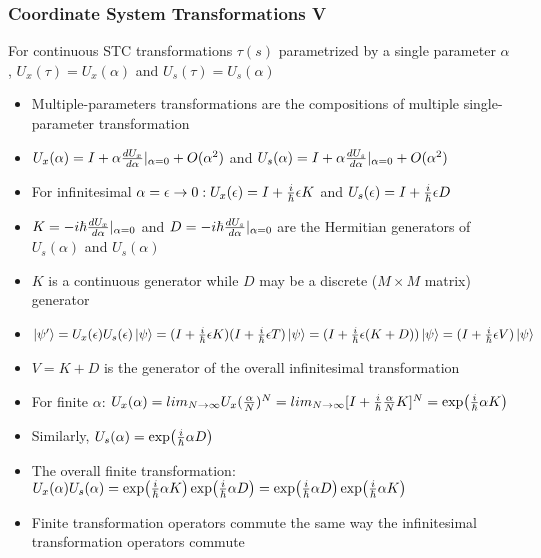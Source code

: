 \documentclass[8pt,t,mathserif,aspectratio=169]{beamer}
\begin{document}
\begin{frame}
  \frametitle{Coordinate System Transformations V}
  \vspace{1mm}
  For continuous STC transformations $\tau(s)$ parametrized by a single parameter $\alpha$, $U_x(\tau) = U_x(\alpha)$ and $U_s(\tau) = U_s(\alpha)$
  \begin{itemize}
    \item Multiple-parameters transformations are the compositions of multiple single-parameter transformation
    \item $U_x(\alpha) = I + \alpha {d U_x \over d\alpha}|_{\alpha = 0} + O(\alpha^2)$ and $U_s(\alpha) = I + \alpha {d U_s \over d\alpha}|_{\alpha = 0} + O(\alpha^2)$
    \item For infinitesimal $\alpha = \epsilon \to 0: U_x(\epsilon) = I + {i \over \hbar} \epsilon K$ and $U_s(\epsilon) = I + {i \over \hbar} \epsilon D$
    \item $K = -i \hbar {d U_x \over d\alpha}|_{\alpha = 0}$ and $D = -i \hbar {d U_s \over d\alpha}|_{\alpha = 0}$ are the Hermitian generators of $U_s(\alpha)$ and $U_s(\alpha)$
    \item $K$ is a continuous generator while $D$ may be a discrete ($M \times M$ matrix) generator
    \item $\ket{\psi'} = U_x(\epsilon) U_s(\epsilon) \ket{\psi} = (I + {i \over \hbar} \epsilon K)(I + {i \over \hbar} \epsilon T) \ket{\psi} = (I + {i \over \hbar} \epsilon (K + D)) \ket{\psi} = (I + {i \over \hbar} \epsilon V) \ket{\psi}$
    \item $V = K + D$ is the generator of the overall infinitesimal transformation
    \item For finite $\alpha$: $U_x(\alpha) = lim_{N \to \infty} U_x({\alpha \over N})^{N} = lim_{N \to \infty} [I + {i \over \hbar} {\alpha \over N} K]^{N} = \exp({i \over \hbar} \alpha K)$
    \item Similarly, $U_s(\alpha) = \exp({i \over \hbar} \alpha D)$
    \item The overall finite transformation: $U_x(\alpha) U_s(\alpha) = \exp({i \over \hbar} \alpha K) \exp({i \over \hbar} \alpha D) = \exp({i \over \hbar} \alpha D) \exp({i \over \hbar} \alpha K)$
    \item Finite transformation operators commute the same way the infinitesimal transformation operators commute
  \end{itemize}
\end{frame}
\end{document}
